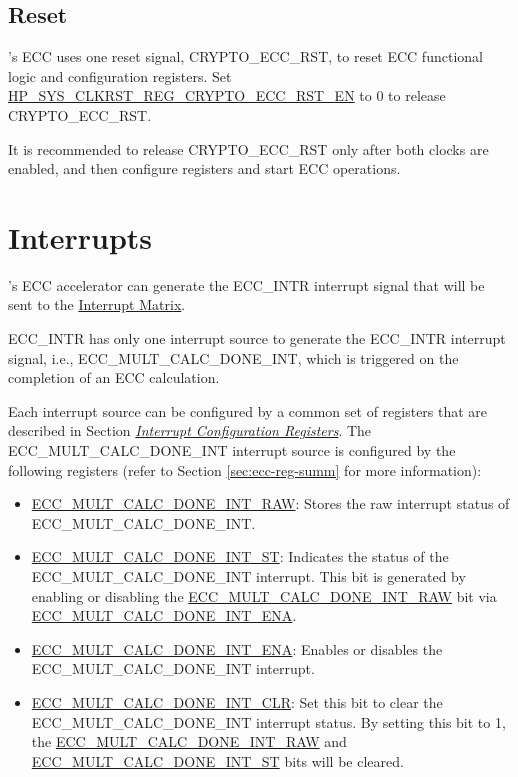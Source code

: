 \documentclass[main\_\_EN.tex]{subfiles}
\begin{document}
\subsection{Reset}

\chipname{}'s ECC uses one reset signal, CRYPTO\_ECC\_RST, to reset ECC functional logic and configuration registers. Set \hyperref[fielddesc:HPSYSCLKRSTREGCRYPTOECCRSTEN]{HP\_SYS\_CLKRST\_REG\_CRYPTO\_ECC\_RST\_EN} to 0 to release CRYPTO\_ECC\_RST.

It is recommended to release CRYPTO\_ECC\_RST only after both clocks are enabled, and then configure registers and start ECC operations.


\section{Interrupts}
\label{sec:ecc-interrupt}

\chipname{}'s ECC accelerator can generate the ECC\_INTR interrupt signal that will be sent to the \hyperref[mod:intmtrx]{Interrupt Matrix}.

ECC\_INTR has only one interrupt source to generate the ECC\_INTR interrupt signal, i.e., \label{int:ECCMULTCALCDONEINT}{ECC\_MULT\_CALC\_DONE\_INT}, which is triggered on the completion of an ECC calculation.

Each interrupt source can be configured by a common set of registers that are described in Section \hyperref[interrupt-config-registers]{\textit{Interrupt Configuration Registers}}. The ECC\_MULT\_CALC\_DONE\_INT interrupt source is configured by the following registers (refer to Section \ref{sec:ecc-reg-summ} \textit{} for more information):

\begin{itemize}
    \item \hyperref[fielddesc:ECCMULTCALCDONEINTRAW]{ECC\_MULT\_CALC\_DONE\_INT\_RAW}: Stores the raw interrupt status of ECC\_MULT\_CALC\_DONE\_INT.
    \item \hyperref[fielddesc:ECCMULTCALCDONEINTST]{ECC\_MULT\_CALC\_DONE\_INT\_ST}: Indicates the status of the ECC\_MULT\_CALC\_DONE\_INT interrupt. This bit is generated by enabling or disabling the \hyperref[fielddesc:ECCMULTCALCDONEINTRAW]{ECC\_MULT\_CALC\_DONE\_INT\_RAW} bit via \hyperref[fielddesc:ECCMULTCALCDONEINTENA]{ECC\_MULT\_CALC\_DONE\_INT\_ENA}.
    \item \hyperref[fielddesc:ECCMULTCALCDONEINTENA]{ECC\_MULT\_CALC\_DONE\_INT\_ENA}: Enables or disables the ECC\_MULT\_CALC\_DONE\_INT interrupt.
    \item \hyperref[fielddesc:ECCMULTCALCDONEINTCLR]{ECC\_MULT\_CALC\_DONE\_INT\_CLR}: Set this bit to clear the ECC\_MULT\_CALC\_DONE\_INT interrupt status. By setting this bit to 1, the \hyperref[fielddesc:ECCMULTCALCDONEINTRAW]{ECC\_MULT\_CALC\_DONE\_INT\_RAW} and  \hyperref[fielddesc:ECCMULTCALCDONEINTST]{ECC\_MULT\_CALC\_DONE\_INT\_ST} bits will be cleared.
\end{itemize}
\end{document}
